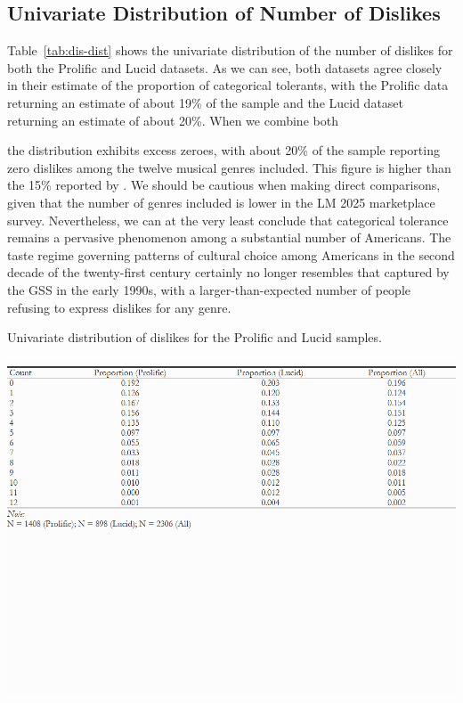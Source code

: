 \documentclass[12pt]{article}
\begin{document}
\subsection*{Univariate Distribution of Number of Dislikes}
Table~\ref{tab:dis-dist} shows the univariate distribution of the number of dislikes for both the Prolific and Lucid datasets. As we can see, both datasets agree closely in their estimate of the proportion of categorical tolerants, with the Prolific data returning an estimate of about 19\% of the sample and the Lucid dataset returning an estimate of about 20\%. When we combine both

the distribution exhibits excess zeroes, with about 20\% of the sample reporting zero dislikes among the twelve musical genres included. This figure is higher than the 15\% reported by \citet{lizardo2016end-4fb}. We should be cautious when making direct comparisons, given that the number of genres included is lower in the LM 2025 marketplace survey. Nevertheless, we can at the very least conclude that categorical tolerance remains a pervasive phenomenon among a substantial number of Americans. The taste regime governing patterns of cultural choice among Americans in the second decade of the twenty-first century certainly no longer resembles that captured by the GSS in the early 1990s, with a larger-than-expected number of people refusing to express dislikes for any genre. 

\begin{table}[ht!]
    \caption{Univariate distribution of dislikes for the Prolific and Lucid samples.}
    \includegraphics[trim={0 9cm 0 0},clip, width=1.0\textwidth]{Tabs/desc-tab-dislike-dist.png}
    \label{tab:dis-dist}
\end{table}
\end{document}
